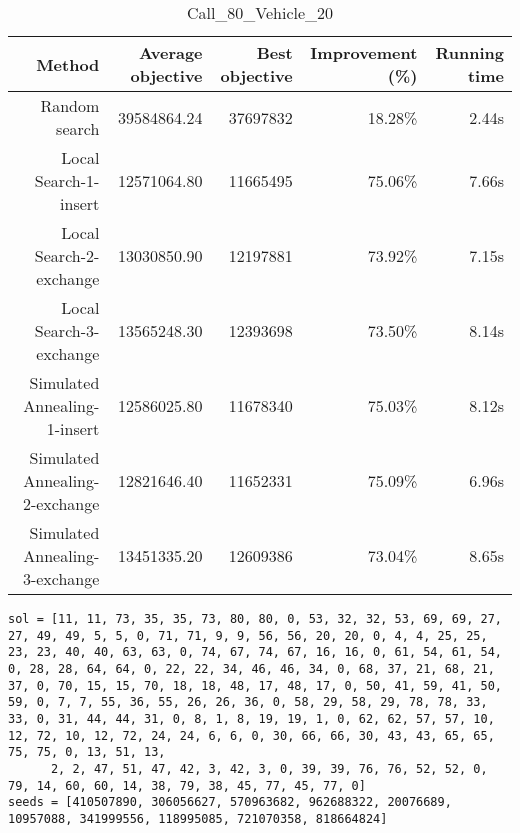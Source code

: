 \begin{table}[ht]
\centering
\caption{Call\_80\_Vehicle\_20}
\label{tab:call80vehicle20}
\begin{tabular}{|r|r|r|r|r|}
Method & Average objective & Best objective & Improvement (\%) & Running time \\
\hline
Random search & 39584864.24 & 37697832 & 18.28\% & 2.44s\\
Local Search-1-insert & 12571064.80 & 11665495 & 75.06\% & 7.66s\\
Local Search-2-exchange & 13030850.90 & 12197881 & 73.92\% & 7.15s\\
Local Search-3-exchange & 13565248.30 & 12393698 & 73.50\% & 8.14s\\
Simulated Annealing-1-insert & 12586025.80 & 11678340 & 75.03\% & 8.12s\\
Simulated Annealing-2-exchange & 12821646.40 & 11652331 & 75.09\% & 6.96s\\
Simulated Annealing-3-exchange & 13451335.20 & 12609386 & 73.04\% & 8.65s\\
\end{tabular}%
\end{table}
\begin{lstlisting}[label={lst:call80vehicle20},caption=Optimal solution call\_80\_vehicle\_20]
sol = [11, 11, 73, 35, 35, 73, 80, 80, 0, 53, 32, 32, 53, 69, 69, 27, 27, 49, 49, 5, 5, 0, 71, 71, 9, 9, 56, 56, 20, 20, 0, 4, 4, 25, 25, 23, 23, 40, 40, 63, 63, 0, 74, 67, 74, 67, 16, 16, 0, 61, 54, 61, 54, 0, 28, 28, 64, 64, 0, 22, 22, 34, 46, 46, 34, 0, 68, 37, 21, 68, 21, 37, 0, 70, 15, 15, 70, 18, 18, 48, 17, 48, 17, 0, 50, 41, 59, 41, 50, 59, 0, 7, 7, 55, 36, 55, 26, 26, 36, 0, 58, 29, 58, 29, 78, 78, 33, 33, 0, 31, 44, 44, 31, 0, 8, 1, 8, 19, 19, 1, 0, 62, 62, 57, 57, 10, 12, 72, 10, 12, 72, 24, 24, 6, 6, 0, 30, 66, 66, 30, 43, 43, 65, 65, 75, 75, 0, 13, 51, 13,
      2, 2, 47, 51, 47, 42, 3, 42, 3, 0, 39, 39, 76, 76, 52, 52, 0, 79, 14, 60, 60, 14, 38, 79, 38, 45, 77, 45, 77, 0]
seeds = [410507890, 306056627, 570963682, 962688322, 20076689, 10957088, 341999556, 118995085, 721070358, 818664824]
\end{lstlisting}%
\clearpage


